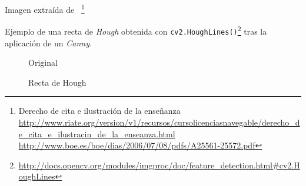 Imagen extraída de \emph{\citep*{opencv_book-bib}}~\footnote{Derecho
  de
  cita e ilustración de la enseñanza\\
  \url{http://www.riate.org/version/v1/recursos/cursolicenciasnavegable/derecho_de_cita_e_ilustracin_de_la_enseanza.html}\\
  \url{http://www.boe.es/boe/dias/2006/07/08/pdfs/A25561-25572.pdf}}

Ejemplo de una recta de \emph{Hough} obtenida con
\texttt{cv2.HoughLines()}\footnote{\url{http://docs.opencv.org/modules/imgproc/doc/feature\_detection.html\#cv2.HoughLines}}
tras la aplicación de un \emph{Canny}.

\begin{figure}[H]
  \caption{Original}
  \centering \setlength\fboxsep{0pt} \setlength\fboxrule{0.5pt}
\end{figure}

\begin{figure}[H]
  \centering \setlength\fboxsep{0pt} \setlength\fboxrule{0.5pt}
  \caption{Recta de Hough}
\end{figure}

